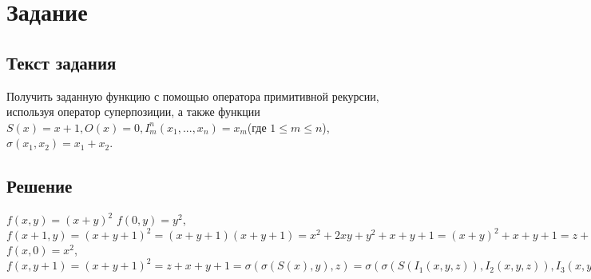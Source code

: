 \documentclass[a4paper, 12pt]{article}
\newcommand{\RNum}[1]{\uppercase\expandafter{\romannumeral #1\relax}}
\begin{document}
\section*{Задание \RNum{1}}
\subsection*{Текст задания} Получить заданную функцию с помощью оператора примитивной рекурсии, используя
оператор суперпозиции, а также функции $ S(x) = x + 1, O(x) = 0, I_m^n(x_1, ..., x_n) = x_m $(где $ 1 \le m \le n$), 
$ \sigma(x_1, x_2) = x_1 + x_2 $.

\subsection*{Решение}
\noindent $ f(x, y) = (x + y)^2 $
\singlespacing
\noindent
$ f(0, y) = y^2 $, \\
$ f(x+1, y) = (x + y + 1)^2 = (x + y + 1)(x + y + 1) = x^2 + 2xy + y^2 + x + y + 1 = (x+y)^2 + x + y + 1 =
z + x + y + 1 = \sigma(\sigma(S(x), y), z) = \sigma(\sigma(S(I_1(x, y, z)), I_2(x, y, z)), I_3(x, y, z))
$
\singlespacing \noindent
$ f(x, 0) = x^2 $, \\ 
$ f(x, y+1) = (x+y+1)^2 = z + x + y + 1 = \sigma(\sigma(S(x), y), z) = \sigma(\sigma(S(I_1(x, y, z)), I_2(x, y, z)), I_3(x, y, z))$
\end{document}
